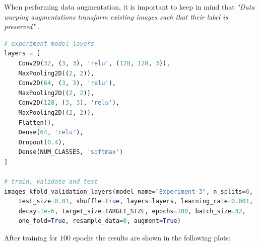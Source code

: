 \documentclass[11pt,a4paper]{article}
\begin{document}
When performing data augmentation, it is important to keep in mind that \textit{"Data warping augmentations transform existing images such that their label is preserved"} \cite{imagedataaugmentationsurvey}.
\begin{lstlisting}[language=Python,frame=single]
# experiment model layers
layers = [
    Conv2D(32, (3, 3), 'relu', (128, 128, 3)),
    MaxPooling2D((2, 2)),
    Conv2D(64, (3, 3), 'relu'),
    MaxPooling2D((2, 2)),
    Conv2D(128, (3, 3), 'relu'),
    MaxPooling2D((2, 2)),
    Flatten(),
    Dense(64, 'relu'),
    Dropout(0.4),
    Dense(NUM_CLASSES, 'softmax')
]

# train, validate and test
images_kfold_validation_layers(model_name="Experiment-3", n_splits=6,
    test_size=0.01, shuffle=True, layers=layers, learning_rate=0.001,
    decay=1e-6, target_size=TARGET_SIZE, epochs=100, batch_size=32,
    one_fold=True, resample_data=0, augment=True)
\end{lstlisting}
After training for $100$ epochs the results are shown in the following plots:
\end{document}
